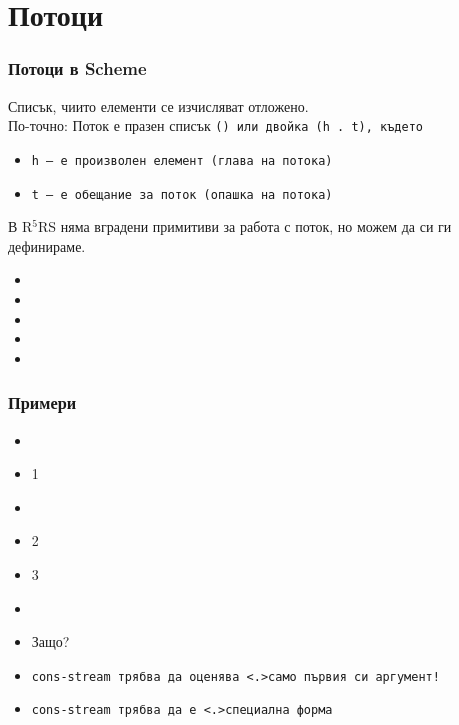 \documentclass[alsotrans]{beamerswitch}
\begin{document}
\section{Потоци}

\begin{frame}
  \frametitle{Потоци в Scheme}

  \begin{definition}[Поток]
    Списък, чиито елементи се изчисляват отложено. \\
    \pause
    По-точно: Поток е празен списък \tt{()} или двойка \tt{(h . t)}, където
    \begin{itemize}
    \item \tt h --- е произволен елемент (глава на потока)
    \item \tt t --- е \alert{обещание} за поток (опашка на потока)
    \end{itemize}
  \end{definition}
  \pause
  В R$^5$RS няма вградени примитиви за работа с поток, но можем да си ги дефинираме.
  \pause
  \begin{itemize}[<+->]
  \item {}
  \item {}
  \item {}
  \item {}
  \item {}
  \end{itemize}
\end{frame}

\begin{frame}[fragile]
  \frametitle{Примери}

  \begin{itemize}[<+->]
  \item {}
  \item {}1
  \item {}
  \item {}2
  \item {}3
  \item {}
  \item<+-| alert@+>Защо?
  \item \tt{cons-stream} трябва да оценява \alert<.>{само първия си аргумент}!
  \item \tt{cons-stream} трябва да е \alert<.>{специална форма}
  \end{itemize}
\end{frame}
\end{document}
